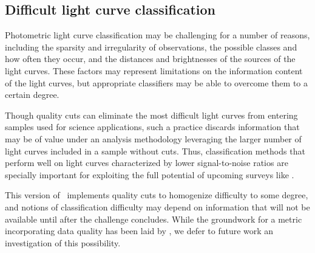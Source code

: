 \subsection{Difficult light curve classification}
\label{sec:difficult}

Photometric light curve classification may be challenging for a number of reasons, including the sparsity and irregularity of observations, the possible classes and how often they occur, and the distances and brightnesses of the sources of the light curves.
These factors may represent limitations on the information content of the light curves, but appropriate classifiers may be able to overcome them to a certain degree.

Though quality cuts can eliminate the most difficult light curves from entering samples used for science applications, such a practice discards information that may be of value under an analysis methodology leveraging the larger number of light curves included in a sample without cuts.
Thus, classification methods that perform well on light curves characterized by lower signal-to-noise ratios are specially important for exploiting the full potential of upcoming surveys like \lsst.

This version of \plasticc\ implements quality cuts to homogenize difficulty to some degree, and notions of classification difficulty may depend on information that will not be available until after the challenge concludes.
While the groundwork for a metric incorporating data quality has been laid by \citet{wu_radio_2018}, we defer to future work an investigation of this possibility.
